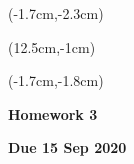 \documentclass[12pt, oneside]{article}
\begin{document}
\begin{textblock*}{4cm}(-1.7cm,-2.3cm)
\end{textblock*}

\begin{textblock*}{8cm}(12.5cm,-1cm)
\end{textblock*}
\begin{textblock*}{13.5cm}(-1.7cm,-1.8cm)
\end{textblock*}

\vspace{1cm}

\begin{center}
\textbf{\Large Homework 3}

\textbf{Due 15 Sep 2020}
\end{center}
\end{document}
